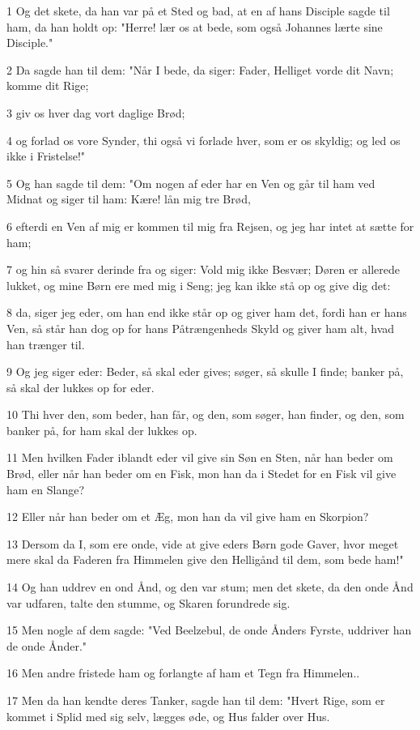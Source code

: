 \par 1 Og det skete, da han var på et Sted og bad, at en af hans Disciple sagde til ham, da han holdt op: "Herre! lær os at bede, som også Johannes lærte sine Disciple."
\par 2 Da sagde han til dem: "Når I bede, da siger: Fader, Helliget vorde dit Navn; komme dit Rige;
\par 3 giv os hver dag vort daglige Brød;
\par 4 og forlad os vore Synder, thi også vi forlade hver, som er os skyldig; og led os ikke i Fristelse!"
\par 5 Og han sagde til dem: "Om nogen af eder har en Ven og går til ham ved Midnat og siger til ham: Kære! lån mig tre Brød,
\par 6 efterdi en Ven af mig er kommen til mig fra Rejsen, og jeg har intet at sætte for ham;
\par 7 og hin så svarer derinde fra og siger: Vold mig ikke Besvær; Døren er allerede lukket, og mine Børn ere med mig i Seng; jeg kan ikke stå op og give dig det:
\par 8 da, siger jeg eder, om han end ikke står op og giver ham det, fordi han er hans Ven, så står han dog op for hans Påtrængenheds Skyld og giver ham alt, hvad han trænger til.
\par 9 Og jeg siger eder: Beder, så skal eder gives; søger, så skulle I finde; banker på, så skal der lukkes op for eder.
\par 10 Thi hver den, som beder, han får, og den, som søger, han finder, og den, som banker på, for ham skal der lukkes op.
\par 11 Men hvilken Fader iblandt eder vil give sin Søn en Sten, når han beder om Brød, eller når han beder om en Fisk, mon han da i Stedet for en Fisk vil give ham en Slange?
\par 12 Eller når han beder om et Æg, mon han da vil give ham en Skorpion?
\par 13 Dersom da I, som ere onde, vide at give eders Børn gode Gaver, hvor meget mere skal da Faderen fra Himmelen give den Helligånd til dem, som bede ham!"
\par 14 Og han uddrev en ond Ånd, og den var stum; men det skete, da den onde Ånd var udfaren, talte den stumme, og Skaren forundrede sig.
\par 15 Men nogle af dem sagde: "Ved Beelzebul, de onde Ånders Fyrste, uddriver han de onde Ånder."
\par 16 Men andre fristede ham og forlangte af ham et Tegn fra Himmelen..
\par 17 Men da han kendte deres Tanker, sagde han til dem: "Hvert Rige, som er kommet i Splid med sig selv, lægges øde, og Hus falder over Hus.
